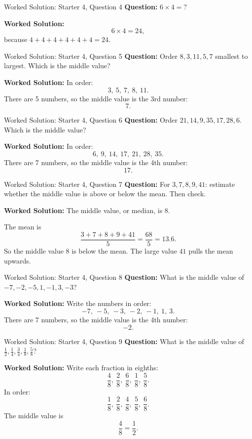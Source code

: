 \documentclass{beamer}
\begin{document}
\begin{frame}{Worked Solution: Starter 4, Question 4}
\textbf{Question:} \(6 \times 4 = ?\)

\textbf{Worked Solution:}
\[
6 \times 4 = 24,
\]
because \(4 + 4 + 4 + 4 + 4 + 4 = 24\).
\end{frame}

\begin{frame}{Worked Solution: Starter 4, Question 5}
\textbf{Question:} Order \(8, 3, 11, 5, 7\) smallest to largest. Which is the middle value?

\textbf{Worked Solution:}
In order:
\[
3,\ 5,\ 7,\ 8,\ 11.
\]
There are 5 numbers, so the middle value is the 3rd number:
\[
7.
\]
\end{frame}

\begin{frame}{Worked Solution: Starter 4, Question 6}
\textbf{Question:} Order \(21, 14, 9, 35, 17, 28, 6\). Which is the middle value?

\textbf{Worked Solution:}
In order:
\[
6,\ 9,\ 14,\ 17,\ 21,\ 28,\ 35.
\]
There are 7 numbers, so the middle value is the 4th number:
\[
17.
\]
\end{frame}

\begin{frame}{Worked Solution: Starter 4, Question 7}
\textbf{Question:} For \(3, 7, 8, 9, 41\): estimate whether the middle value is above or below the mean. Then check.

\textbf{Worked Solution:}
The middle value, or median, is \(8\).

The mean is
\[
\frac{3 + 7 + 8 + 9 + 41}{5}
= \frac{68}{5}
= 13.6.
\]
So the middle value \(8\) is below the mean. The large value \(41\) pulls the mean upwards.
\end{frame}

\begin{frame}{Worked Solution: Starter 4, Question 8}
\textbf{Question:} What is the middle value of \(-7, -2, -5, 1, -1, 3, -3\)?

\textbf{Worked Solution:}
Write the numbers in order:
\[
-7,\ -5,\ -3,\ -2,\ -1,\ 1,\ 3.
\]
There are 7 numbers, so the middle value is the 4th number:
\[
-2.
\]
\end{frame}

\begin{frame}{Worked Solution: Starter 4, Question 9}
\textbf{Question:} What is the middle value of \(\frac{1}{2}, \frac{1}{4}, \frac{3}{4}, \frac{1}{8}, \frac{5}{8}\)?

\textbf{Worked Solution:}
Write each fraction in eighths:
\[
\frac{4}{8},\ \frac{2}{8},\ \frac{6}{8},\ \frac{1}{8},\ \frac{5}{8}.
\]
In order:
\[
\frac{1}{8},\ \frac{2}{8},\ \frac{4}{8},\ \frac{5}{8},\ \frac{6}{8}.
\]
The middle value is
\[
\frac{4}{8} = \frac{1}{2}.
\]
\end{frame}
\end{document}
